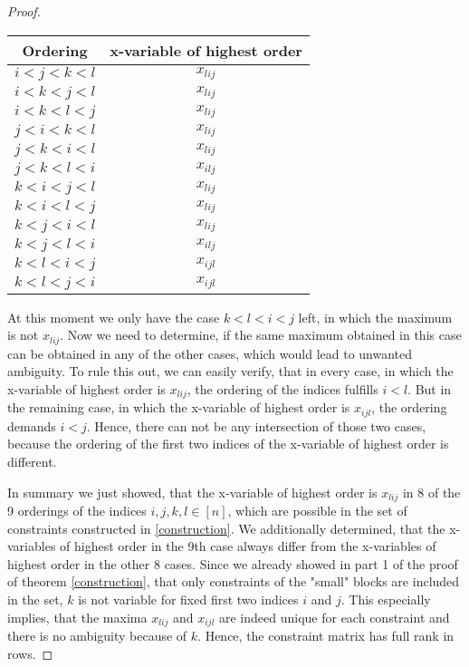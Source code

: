 \documentclass{scrartcl}
\theoremstyle{plain}
\begin{document}
\begin{proof}
	\begin{center}
		\begin{tabular}{||c | c ||} 
			\hline
			Ordering & x-variable of highest order \\ [0.5ex] 
			\hline\hline
			$i<j<k<l$ & $x_{lij}$ \\ 
			\hline
			$i<k<j<l$ & $x_{lij}$ \\ 
			\hline
			$i<k<l<j$ & $x_{lij}$ \\ 
			\hline
			$j<i<k<l$ & $x_{lij}$ \\ 
			\hline
			$j<k<i<l$ & $x_{lij}$ \\ 
			\hline
			\cellcolor{red!25}$j<k<l<i$ & \cellcolor{red!25}$x_{ilj}$ \\ 
			\hline
			$k<i<j<l$ & $x_{lij}$ \\ 
			\hline
			$k<i<l<j$ & $x_{lij}$ \\ 
			\hline
			$k<j<i<l$ & $x_{lij}$ \\ 
			\hline
			\cellcolor{red!25}$k<j<l<i$ & \cellcolor{red!25}$x_{ilj}$ \\ 
			\hline
			$k<l<i<j$ & $x_{ijl}$ \\ 
			\hline
			\cellcolor{red!25}$k<l<j<i$ & \cellcolor{red!25}$x_{ijl}$ \\ 
			\hline
		\end{tabular}
	\end{center}
	
	At this moment we only have the case $k<l<i<j$ left, in which the maximum is not $x_{lij}$. Now we need to determine, if the same maximum obtained in this case can be obtained in any of the other cases, which would lead to unwanted ambiguity. To rule this out, we can easily verify, that in every case, in which the x-variable of highest order is $x_{lij}$, the ordering of the indices fulfills $i<l$. But in the remaining case, in which the x-variable of highest order is $x_{ijl}$, the ordering demands $i<j$. Hence, there can not be any intersection of those two cases, because the ordering of the first two indices of the x-variable of highest order is different.
	
	In summary we just showed, that the x-variable of highest order is $x_{lij}$ in 8 of the 9 orderings of the indices $i,j,k,l \in [n]$, which are possible in the set of constraints constructed in \ref{construction}. We additionally determined, that the x-variables of highest order in the 9th case always differ from the x-variables of highest order in the other 8 cases. Since we already showed in part 1 of the proof of theorem \ref{construction}, that only constraints of the "small" blocks are included in the set, $k$ is not variable for fixed first two indices $i$ and $j$. This especially implies, that the maxima $x_{lij}$ and $x_{ijl}$ are indeed unique for each constraint and there is no ambiguity because of $k$. Hence, the constraint matrix has full rank in rows.
\end{proof}
\end{document}
